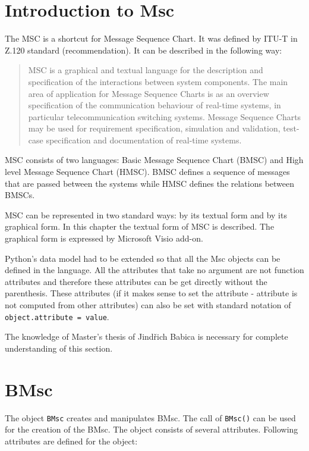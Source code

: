 \documentclass[11pt,oneside]{fithesis2}
\newcommand{\T}[1]{\texttt{#1}}
\begin{document}
\section{Introduction to Msc}
The MSC is a shortcut for Message Sequence Chart. It was defined by ITU-T\cite{itu-t} in Z.120\cite{z120} standard (recommendation). It can be described in the following way:
\begin{quote}
MSC is a graphical and textual language for the description and specification of the interactions between system components. The main area of application for Message Sequence Charts is as an overview specification of the communication behaviour of real-time systems, in particular telecommunication switching systems. Message Sequence Charts may be used for requirement specification, simulation and validation, test-case specification and documentation of real-time systems.\cite{sdl-forum}
\end{quote}

MSC consists of two languages: Basic Message Sequence Chart (BMSC) and High level Message Sequence Chart (HMSC). BMSC defines a sequence of messages that are passed between the systems while HMSC defines the relations between BMSCs.

MSC can be represented in two standard ways: by its textual form and by its graphical form. In this chapter the textual form of MSC is described. The graphical form is expressed by Microsoft Visio\cite{visio} add-on.

Python's data model had to be extended so that all the Msc objects can be defined in the language. All the attributes that take no argument are not function attributes and therefore these attributes can be get directly without the parenthesis. These attributes (if it makes sense to set the attribute - attribute is not computed from other attributes) can also be set with standard notation of \T{object.attribute = value}.

The knowledge of Master's thesis of Jindřich Babica\cite{babica} is necessary for complete understanding of this section.

\section{BMsc}
The object \T{BMsc} creates and manipulates BMsc. The call of \T{BMsc()} can be used for the creation of the BMsc. The object consists of several attributes. Following attributes are defined for the object:
\end{document}
